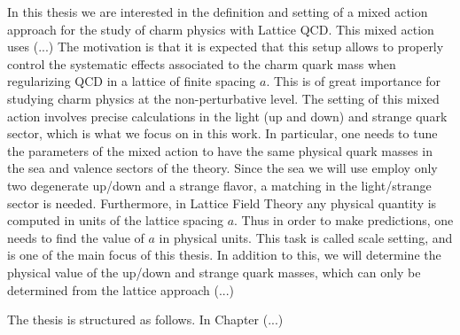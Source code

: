 In this thesis we are interested in the definition and setting of a mixed action approach for the study of charm physics with Lattice QCD. This mixed action uses (...) The motivation is that it is expected that this setup allows to properly control the systematic effects associated to the charm quark mass when regularizing QCD in a lattice of finite spacing $a$. This is of great importance for studying charm physics at the non-perturbative level. The setting of this mixed action involves precise calculations in the light (up and down) and strange quark sector, which is what we focus on in this work. In particular, one needs to tune the parameters of the mixed action to have the same physical quark masses in the sea and valence sectors of the theory. Since the sea we will use employ only two degenerate up/down and a strange flavor, a matching in the light/strange sector is needed. Furthermore, in Lattice Field Theory any physical quantity is computed in units of the lattice spacing $a$. Thus in order to make predictions, one needs to find the value of $a$ in physical units. This task is called scale setting, and is one of the main focus of this thesis. In addition to this, we will determine the physical value of the up/down and strange quark masses, which can only be determined from the lattice approach (...)

The thesis is structured as follows. In Chapter (...)

